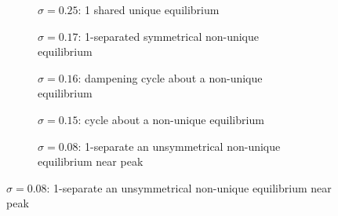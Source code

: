 \documentclass{article}
\begin{document}
                    \begin{figure}[ht!] 
                    \centering
                        \begin{subfigure}[b]{.47\linewidth}
                             
                            \caption{$\sigma=0.25$: 1 shared unique equilibrium } 
                            \label{fig:3player_equilibria:a} 
                        \end{subfigure} 
                        \begin{subfigure}[b]{.47\linewidth}
                            
                            \caption{$\sigma=0.17$: 1-separated symmetrical non-unique equilibrium} 
                            \label{fig:3player_equilibria:b} 
                        \end{subfigure} 
                        \vspace{4ex}
                    
                        \begin{subfigure}[b]{.47\linewidth}
                            
                            \caption{$\sigma=0.16$: dampening cycle about a non-unique equilibrium}
                            \label{fig:3player_equilibria:c} 
                        \end{subfigure}
                        \begin{subfigure}[b]{.47\linewidth}
                            
                            \caption{$\sigma=0.15$: cycle about a non-unique equilibrium} 
                            \label{fig:3player_equilibria:d} 
                        \end{subfigure} 
                        \vspace{4ex}
                
                        \begin{subfigure}[b]{.47\linewidth}
                             
                            \caption{$\sigma=0.08$: 1-separate an unsymmetrical non-unique equilibrium near peak} 
                            \label{fig:3player_equilibria:e} 
                        \end{subfigure} 
                

\end{figure}
\end{document}
